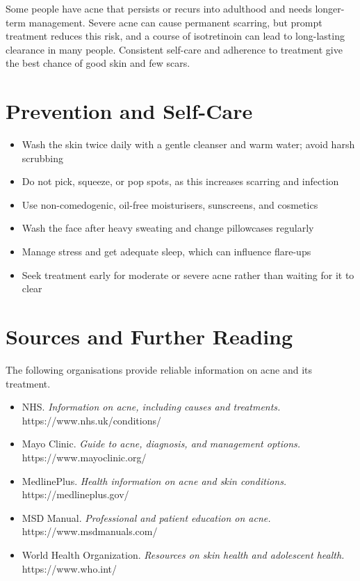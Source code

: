 Some people have acne that persists or recurs into adulthood and needs longer-term management. Severe acne can cause permanent scarring, but prompt treatment reduces this risk, and a course of isotretinoin can lead to long-lasting clearance in many people. Consistent self-care and adherence to treatment give the best chance of good skin and few scars.

\section*{Prevention and Self-Care}
\begin{itemize}
    \item Wash the skin twice daily with a gentle cleanser and warm water; avoid harsh scrubbing
    \item Do not pick, squeeze, or pop spots, as this increases scarring and infection
    \item Use non-comedogenic, oil-free moisturisers, sunscreens, and cosmetics
    \item Wash the face after heavy sweating and change pillowcases regularly
    \item Manage stress and get adequate sleep, which can influence flare-ups
    \item Seek treatment early for moderate or severe acne rather than waiting for it to clear
\end{itemize}

\section*{Sources and Further Reading}
The following organisations provide reliable information on acne and its treatment.

\begin{itemize}
    \item NHS. \textit{Information on acne, including causes and treatments.} https://www.nhs.uk/conditions/
    \item Mayo Clinic. \textit{Guide to acne, diagnosis, and management options.} https://www.mayoclinic.org/
    \item MedlinePlus. \textit{Health information on acne and skin conditions.} https://medlineplus.gov/
    \item MSD Manual. \textit{Professional and patient education on acne.} https://www.msdmanuals.com/
    \item World Health Organization. \textit{Resources on skin health and adolescent health.} https://www.who.int/
\end{itemize}
